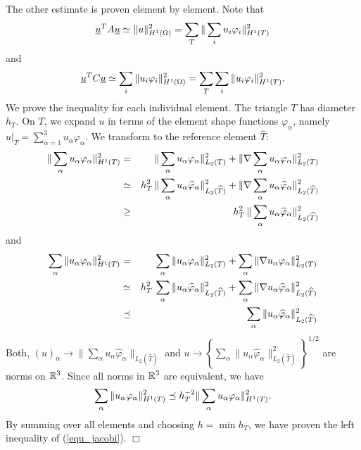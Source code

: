 The other estimate is proven element by element. Note that
$$
\underline u^T A \underline u \simeq \| u \|_{H^1(\Omega)}^2 = \sum_T \| \sum_i u_i \varphi_i \|_{H^1(T)}^2
$$
and
$$
\underline u^T C \underline u \simeq \sum_i \| u_i \varphi_i \|_{H^1(\Omega)}^2
= \sum_T  \sum_i \| u_i \varphi_i \|_{H^1(T)}^2.
$$
We prove the inequality for each individual element.
The triangle $T$ has diameter $h_T$. On $T$, we expand $u$ in terms of
the element shape functions $\varphi_\alpha$, namely
$u|_T = \sum_{\alpha=1}^3 u_\alpha \varphi_\alpha$. We transform to the
reference element $\widehat T$:
\begin{eqnarray*}
\| \sum_\alpha u_\alpha \varphi_\alpha \|_{H^1(T)}^2 & = &
\| \sum_\alpha u_\alpha \varphi_\alpha \|_{L_2(T)}^2 +
\| \nabla \sum_\alpha u_\alpha \varphi_\alpha \|_{L_2(T)}^2 \\
        & \simeq & 
h_T^2 \, \| \sum_\alpha u_\alpha \widehat \varphi_\alpha \|_{L_2(\widehat T)}^2 +
\| \nabla \sum_\alpha u_\alpha \widehat \varphi_\alpha \|_{L_2(\widehat T)}^2 \\
& \geq & 
h_T^2 \, \| \sum_\alpha u_\alpha \widehat \varphi_\alpha \|_{L_2(\widehat T)}^2
\end{eqnarray*}
and
\begin{eqnarray*}
 \sum_\alpha\| u_\alpha \varphi_\alpha \|_{H^1(T)}^2 & = &
\sum_\alpha \|  u_\alpha \varphi_\alpha \|_{L_2(T)}^2 +
\sum_\alpha \| \nabla  u_\alpha \varphi_\alpha \|_{L_2(T)}^2 \\
        & \simeq & 
h_T^2 \, \sum_\alpha \|  u_\alpha \widehat \varphi_\alpha \|_{L_2(\widehat T)}^2 +
\sum_\alpha \| \nabla  u_\alpha \widehat \varphi_\alpha \|_{L_2(\widehat T)}^2 \\
& \preceq & \sum_\alpha \|  u_\alpha \widehat \varphi_\alpha \|_{L_2(\widehat T)}^2 
\end{eqnarray*}
Both, $(u)_\alpha \rightarrow \| \sum_\alpha u_\alpha \widehat \varphi_\alpha \|_{L_2(\widehat T)}$ and
$u \rightarrow \left\{ \sum_\alpha \|  u_\alpha \widehat \varphi_\alpha \|_{L_2(\widehat T)}^2 \right\}^{1/2}$ are norms on ${\mathbb R}^3$. Since all norms in ${\mathbb R}^3$ are equivalent, we have
\begin{equation}  \label{equ_estjact}
 \sum_\alpha\| u_\alpha \varphi_\alpha \|_{H^1(T)}^2 \preceq h_T^{-2}
\| \sum_\alpha u_\alpha \varphi_\alpha \|_{H^1(T)}^2.
\end{equation}
By summing over all elements and choosing $h = \min h_T$, we have proven
the left inequality of (\ref{equ_jacobi}).
\hfill $\Box$

\bigskip

